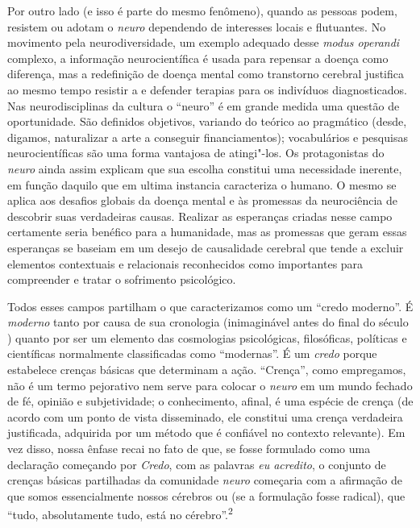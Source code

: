 Por outro lado (e isso é parte do mesmo fenômeno), quando as pessoas
podem, resistem ou adotam o \emph{neuro} dependendo de interesses locais
e flutuantes. No movimento pela neurodiversidade, um exemplo adequado
desse \emph{modus operandi} complexo, a informação neurocientífica é
usada para repensar a doença como diferença, mas a redefinição de doença
mental como transtorno cerebral justifica ao mesmo tempo resistir a e
defender terapias para os indivíduos diagnosticados. Nas
neurodisciplinas da cultura o ``neuro'' é em grande medida uma questão
de oportunidade. São definidos objetivos, variando do teórico ao
pragmático (desde, digamos, naturalizar a arte a conseguir
financiamentos); vocabulários e pesquisas neurocientíficas são uma forma
vantajosa de atingi"-los. Os protagonistas do \emph{neuro} ainda assim
explicam que sua escolha constitui uma necessidade inerente, em função
daquilo que em ultima instancia caracteriza o humano. O mesmo se aplica
aos desafios globais da doença mental e às promessas da neurociência de
descobrir suas verdadeiras causas. Realizar as esperanças criadas nesse
campo certamente seria benéfico para a humanidade, mas as promessas que
geram essas esperanças se baseiam em um desejo de causalidade cerebral
que tende a excluir elementos contextuais e relacionais reconhecidos
como importantes para compreender e tratar o sofrimento psicológico.

Todos esses campos partilham o que caracterizamos como um ``credo
moderno''. É \emph{moderno} tanto por causa de sua cronologia
(inimaginável antes do final do século ) quanto por ser um elemento
das cosmologias psicológicas, filosóficas, políticas e científicas
normalmente classificadas como ``modernas''. É um \emph{credo} porque
estabelece crenças básicas que determinam a ação. ``Crença'', como
empregamos, não é um termo pejorativo nem serve para colocar o
\emph{neuro} em um mundo fechado de fé, opinião e subjetividade; o
conhecimento, afinal, é uma espécie de crença (de acordo com um ponto de
vista disseminado, ele constitui uma crença verdadeira justificada,
adquirida por um método que é confiável no contexto relevante). Em vez
disso, nossa ênfase recai no fato de que, se fosse formulado como uma
declaração começando por \emph{Credo}, com as palavras \emph{eu
acredito}, o conjunto de crenças básicas partilhadas da comunidade
\emph{neuro} começaria com a afirmação de que somos essencialmente
nossos cérebros ou (se a formulação fosse radical), que ``tudo,
absolutamente tudo, está no cérebro''.\textsuperscript{2}

